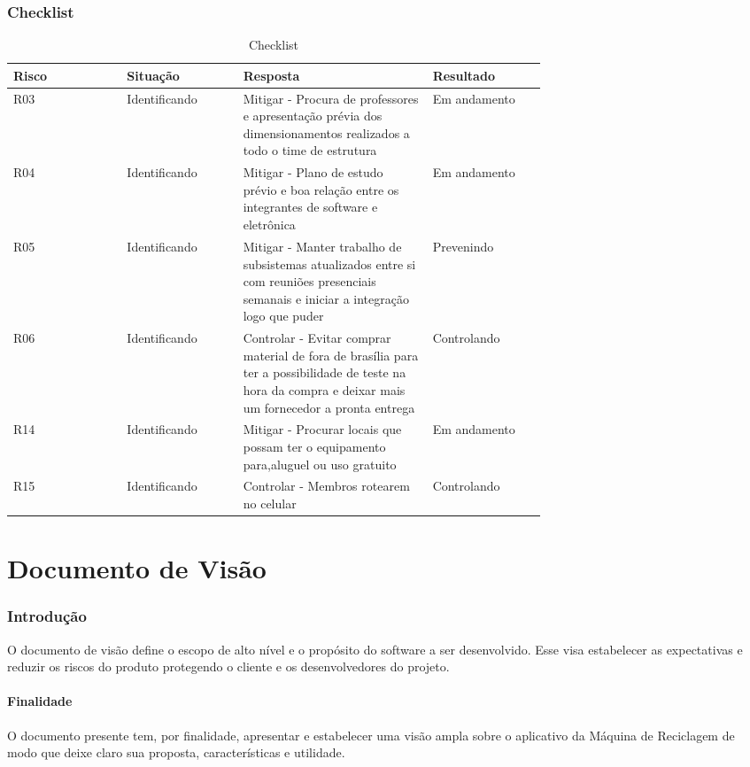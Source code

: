 \begin{apendicesenv}
\subsection{Checklist}
\begin{table}[!htp]
    \centering
    \caption{Checklist}
    \label{my-label}
    \begin{tabular}{|p{0.15\linewidth}|p{0.15\linewidth}|p{0.25\linewidth}|p{0.15\linewidth}|}
    \hline
    \textbf{Risco} & \textbf{Situação} & \textbf{Resposta} & \textbf{Resultado} \\ \hline
    R03 & Identificando & Mitigar - Procura de professores e apresentação prévia dos dimensionamentos realizados a todo o time de estrutura & Em andamento \\ \hline
    R04 & Identificando & Mitigar - Plano de estudo prévio e boa relação entre os integrantes de software e eletrônica & Em andamento \\ \hline
    R05 & Identificando & Mitigar - Manter trabalho de subsistemas atualizados entre si com reuniões presenciais semanais e iniciar a integração logo que puder & Prevenindo \\ \hline
    R06 & Identificando & Controlar - Evitar comprar material de fora de brasília para ter a possibilidade de teste na hora da compra e deixar mais um fornecedor a pronta entrega & Controlando \\ \hline
    R14 & Identificando & Mitigar - Procurar locais que possam ter o equipamento para,aluguel ou uso gratuito & Em andamento \\ \hline
    R15 & Identificando & Controlar - Membros rotearem no celular & Controlando \\ \hline
    \end{tabular}
\end{table}

\chapter{Documento de Visão}

\subsection{Introdução}
O documento de visão define o escopo de alto nível e o propósito do software a ser desenvolvido. Esse visa estabelecer as expectativas e reduzir os riscos do produto protegendo o cliente e os desenvolvedores do projeto.

\subsubsection{Finalidade}
O documento presente tem, por finalidade, apresentar e estabelecer uma visão ampla sobre o aplicativo da Máquina de Reciclagem de modo que deixe claro sua proposta, características e utilidade.


\end{apendicesenv}
